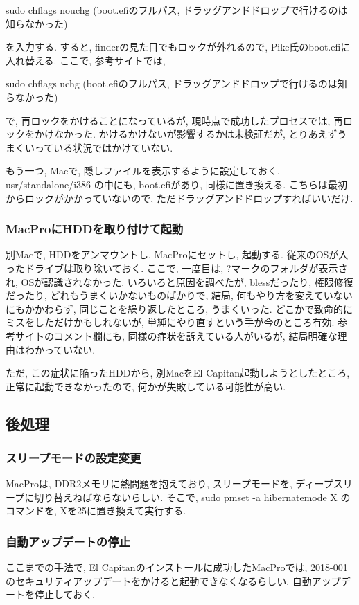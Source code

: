\documentclass{jsarticle}
\begin{document}
sudo chflags nouchg (boot.efiのフルパス, ドラッグアンドドロップで行けるのは知らなかった)

を入力する. 
すると, finderの見た目でもロックが外れるので, Pike氏のboot.efiに入れ替える. 
ここで, 参考サイト\cite{Easiest_Reference}では, 

sudo chflags uchg (boot.efiのフルパス, ドラッグアンドドロップで行けるのは知らなかった)

で, 再ロックをかけることになっているが, 現時点で成功したプロセスでは, 再ロックをかけなかった. 
かけるかけないが影響するかは未検証だが, とりあえずうまくいっている状況ではかけていない. 

もう一つ, Macで, 隠しファイルを表示するように設定しておく. 
usr/standalone/i386 の中にも, boot.efiがあり, 同様に置き換える. こちらは最初からロックがかかっていないので, ただドラッグアンドドロップすればいいだけ. 

\subsubsection{MacProにHDDを取り付けて起動}
別Macで, HDDをアンマウントし, MacProにセットし, 起動する. 従来のOSが入ったドライブは取り除いておく. 
ここで, 一度目は, ?マークのフォルダが表示され, OSが認識されなかった. いろいろと原因を調べたが, blessだったり, 権限修復だったり, どれもうまくいかないものばかりで, 
結局, 何もやり方を変えていないにもかかわらず, 同じことを繰り返したところ, うまくいった. どこかで致命的にミスをしただけかもしれないが, 
単純にやり直すという手が今のところ有効. 参考サイト\cite{Easiest_Reference}のコメント欄にも, 同様の症状を訴えている人がいるが, 結局明確な理由はわかっていない. 

ただ, この症状に陥ったHDDから, 別MacをEl Capitan起動しようとしたところ, 正常に起動できなかったので, 何かが失敗している可能性が高い. 

\subsection{後処理}
\subsubsection{スリープモードの設定変更}
MacProは, DDR2メモリに熱問題を抱えており, スリープモードを, ディープスリープに切り替えねばならないらしい\cite{SleepMode_Issue_Doc}. そこで, 
sudo pmset -a hibernatemode X のコマンドを, Xを25に置き換えて実行する. 

\subsubsection{自動アップデートの停止}
ここまでの手法で, El Capitanのインストールに成功したMacProでは, 2018-001のセキュリティアップデートをかけると起動できなくなるらしい\cite{Security_Update_Issue_Doc}. 自動アップデートを停止しておく. 
\end{document}
